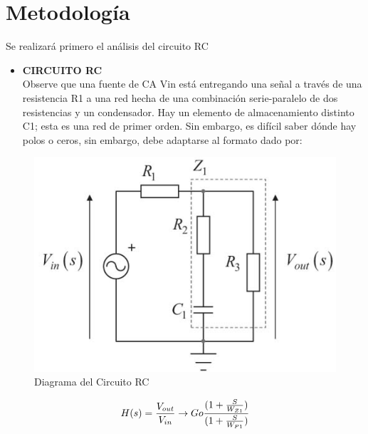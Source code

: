 \documentclass[letterpaper,10pt]{article}
\begin{document}
	
	\pagebreak
    \section{Metodología}
    \vspace*{0.3in}	
    
    Se realizará primero el análisis del circuito RC
    \vspace*{0.3in}
    
    \begin{itemize}
    	\item
    	\textbf{CIRCUITO RC}\vspace*{0.4in}\\
    	Observe que una fuente de CA Vin está entregando una señal a través de una resistencia R1 a una red hecha de una combinación serie-paralelo de dos resistencias y un condensador.
    	Hay un elemento de almacenamiento distinto C1; esta es una red de primer orden.
    	Sin embargo, es difícil saber dónde hay polos o ceros, sin embargo, debe
    	adaptarse al formato dado por:
    \end{itemize}
    \vspace*{0.2in}
    	\begin{figure}[h!]
    		\centering
    		\includegraphics[scale=0.4]{CIRCUITORC}
    		\caption{Diagrama del Circuito RC}
    	\end{figure}

        \vspace*{0.3in}
    \begin{equation}
    H(s) = \frac {V_{out}}{V_{in}} \rightarrow Go \frac {(1+ \frac{S}{W_{Z1}})}{(1+ \frac{S}{W_{P1}})}\\  
    \end{equation}
    
\end{document}
